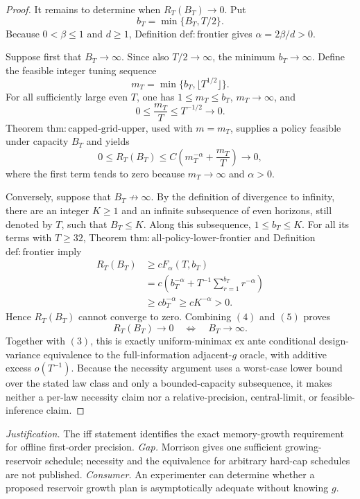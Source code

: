 \documentclass{article}
\begin{document}
\begin{proof}
It remains to determine when \(R_T(B_T)\to0\).  Put
\[
b_T=\min\{B_T,T/2\}.
\]
Because \(0<\beta\le1\) and \(d\ge1\), Definition \(\mathrm{def:frontier}\) gives \(\alpha=2\beta/d>0\).

Suppose first that \(B_T\to\infty\).  Since also \(T/2\to\infty\), the minimum \(b_T\to\infty\).  Define the feasible integer tuning sequence
\[
m_T=\min\{b_T,\lfloor T^{1/2}\rfloor\}.
\]
For all sufficiently large even \(T\), one has \(1\le m_T\le b_T\), \(m_T\to\infty\), and
\[
0\le \frac{m_T}{T}\le T^{-1/2}\longrightarrow0.
\]
Theorem \(\mathrm{thm:capped\text{-}grid\text{-}upper}\), used with \(m=m_T\), supplies a policy feasible under capacity \(B_T\) and yields
\[
0\le R_T(B_T)
\le C\left(m_T^{-\alpha}+\frac{m_T}{T}\right)
\longrightarrow0,
\tag{4}
\]
where the first term tends to zero because \(m_T\to\infty\) and \(\alpha>0\).

Conversely, suppose that \(B_T\not\to\infty\).  By the definition of divergence to infinity, there are an integer \(K\ge1\) and an infinite subsequence of even horizons, still denoted by \(T\), such that \(B_T\le K\).  Along this subsequence, \(1\le b_T\le K\).  For all its terms with \(T\ge32\), Theorem \(\mathrm{thm:all\text{-}policy\text{-}lower\text{-}frontier}\) and Definition \(\mathrm{def:frontier}\) imply
\[
\begin{split}
R_T(B_T)
&\ge cF_\alpha(T,b_T)\\
&=c\left(b_T^{-\alpha}+T^{-1}\sum_{r=1}^{b_T}r^{-\alpha}\right)\\
&\ge cb_T^{-\alpha}
\ge cK^{-\alpha}>0.
\end{split}
\tag{5}
\]
Hence \(R_T(B_T)\) cannot converge to zero.  Combining \((4)\) and \((5)\) proves
\[
R_T(B_T)\to0
\quad\Longleftrightarrow\quad
B_T\to\infty.
\]
Together with \((3)\), this is exactly uniform-minimax ex ante conditional design-variance equivalence to the full-information adjacent-\(g\) oracle, with additive excess \(o(T^{-1})\).  Because the necessity argument uses a worst-case lower bound over the stated law class and only a bounded-capacity subsequence, it makes neither a per-law necessity claim nor a relative-precision, central-limit, or feasible-inference claim.
\end{proof}
\par\smallskip\noindent \textit{Justification.} The iff statement identifies the exact memory-growth requirement for offline first-order precision. \textit{Gap.} Morrison gives one sufficient growing-reservoir schedule; necessity and the equivalence for arbitrary hard-cap schedules are not published. \textit{Consumer.} An experimenter can determine whether a proposed reservoir growth plan is asymptotically adequate without knowing \(g\).
\end{document}
